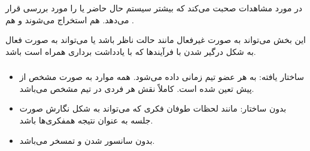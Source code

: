 در مورد مشاهدات صحبت می‌کند که بیشتر سیستم حال حاضر یا  را مورد
بررسی قرار می‌دهد. هم  استخراج می‌شوند و هم
.

این بخش می‌تواند به صورت غیرفعال مانند حالت ناظر باشد یا می‌تواند به صورت فعال
به شکل درگیر شدن با فرآیند‌ها که با یادداشت برداری همراه است باشد.

\subsubsection{}

\begin{itemize}
    \item ساختار یافته: به هر عضو تیم زمانی داده می‌شود. همه موارد به صورت مشخص
    از پیش تعین شده است. کاملاً نقش هر فردی در تیم مشخص می‌باشد.
    \item بدون ساختار: مانند لحظات طوفان فکری که می‌تواند به شکل نگارش صورت جلسه
    به عنوان نتیجه همفکری‌ها باشد.
    \item بدون سانسور شدن و تمسخر می‌باشد.
\end{itemize}

